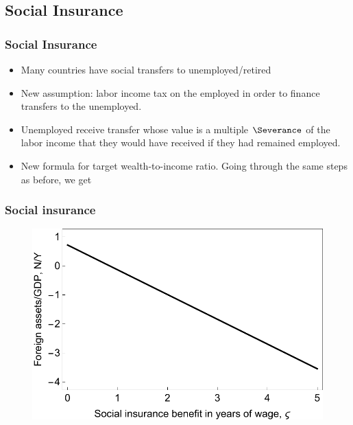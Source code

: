 \documentclass{beamer}
\begin{document}
\subsection{Social Insurance}
\begin{frame}
\frametitle{Social Insurance}
    \begin{itemize}
    \item Many countries have social transfers to unemployed/retired
    \item New assumption: labor income tax on the employed in order to finance transfers to
the unemployed.
    \item Unemployed receive transfer whose value is a multiple $\Severance$ of the labor income that they would have received if they had remained employed.
    \item New formula for target wealth-to-income ratio.  Going through the same steps as before, we get

%
    \end{itemize}

\end{frame}


\begin{frame}
\frametitle{Social insurance}
    \begin{figure}
    \centering
    \includegraphics[width=.6\textwidth]{../figures/socins.pdf}
    \end{figure}
\end{frame}

\end{document}
